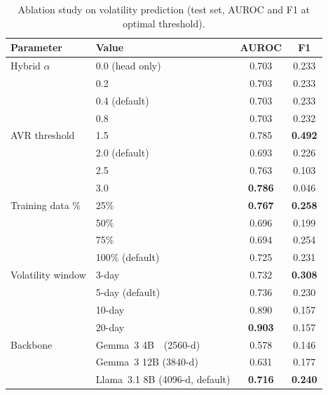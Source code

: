 \documentclass{article}
\newcommand{\multirow}[3]{#3}  %
\begin{document}
\begin{table}[t]
\centering
\caption{Ablation study on volatility prediction (test set, AUROC and F1 at optimal threshold).}
\label{tab:ablation}
\small
\begin{tabular}{@{}llcc@{}}
\toprule
\textbf{Parameter} & \textbf{Value} & \textbf{AUROC} & \textbf{F1} \\
\midrule
\multirow{4}{*}{Hybrid $\alpha$}
  & 0.0 (head only)  & 0.703 & 0.233 \\
  & 0.2              & 0.703 & 0.233 \\
  & 0.4 (default)    & 0.703 & 0.233 \\
  & 0.8              & 0.703 & 0.232 \\
\midrule
\multirow{4}{*}{AVR threshold}
  & 1.5              & 0.785 & \textbf{0.492} \\
  & 2.0 (default)    & 0.693 & 0.226 \\
  & 2.5              & 0.763 & 0.103 \\
  & 3.0              & \textbf{0.786} & 0.046 \\
\midrule
\multirow{4}{*}{Training data \%}
  & 25\%             & \textbf{0.767} & \textbf{0.258} \\
  & 50\%             & 0.696 & 0.199 \\
  & 75\%             & 0.694 & 0.254 \\
  & 100\% (default)  & 0.725 & 0.231 \\
\midrule
\multirow{4}{*}{Volatility window}
  & 3-day            & 0.732 & \textbf{0.308} \\
  & 5-day (default)  & 0.736 & 0.230 \\
  & 10-day           & 0.890 & 0.157 \\
  & 20-day           & \textbf{0.903} & 0.157 \\
\midrule
\multirow{3}{*}{Backbone}
  & Gemma~3 4B~~(2560-d)             & 0.578 & 0.146 \\
  & Gemma~3 12B (3840-d)             & 0.631 & 0.177 \\
  & Llama~3.1 8B (4096-d, default)   & \textbf{0.716} & \textbf{0.240} \\
\bottomrule
\end{tabular}
\end{table}
\end{document}
